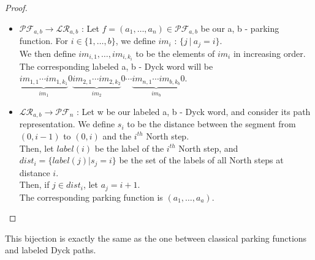 \begin{proof}
    ~\
    \begin{itemize}
        \item $\mathcal{PF}_{a,b} \to \mathcal{LR}_{a,b}$ :
        Let $f = (a_1, \ldots, a_n) \in \mathcal{PF}_{a,b}$
        be our a, b - parking function. For $i \in \{1, \ldots,
        b\}$, we define $im_i$ : $\{j\ |\ a_j = i\}$. \\
        We then define $im_{i,1}, \ldots, im_{i,k_i}$ to be
        the elements of $im_i$ in increasing order.\\
        The corresponding labeled a, b - Dyck word will be \\
        $\underbrace{im_{1,1} \cdots im_{1,k_1}}_{im_1}0
         \underbrace{im_{2,1} \cdots im_{2,k_2}}_{im_2}0
         \cdots
         \underbrace{im_{n,1} \cdots im_{b,k_b}}_{im_b}0$.

        \item $\mathcal{LR}_{a,b} \to \mathcal{PF}_n$ :
        Let w be our labeled a, b - Dyck word, and consider its
        path representation. We define $s_i$ to be the
        distance between the segment from $(0, i-1)$ to
        $(0,i)$ and the $i^{th}$ North step.\\
        Then, let $label(i)$ be the label of the $i^{th}$
        North step, and $dist_i = \{label(j) | s_j = i\}$
        be the set of the labels of all North steps at
        distance $i$.\\
        Then, if $j \in dist_i$, let $a_j = i + 1$.\\
        The corresponding parking function is
        $(a_1, \ldots, a_a)$.
    \end{itemize}
\end{proof}

\begin{rem}
    This bijection is exactly the same as the one between
    classical parking functions and labeled Dyck paths.
\end{rem}

